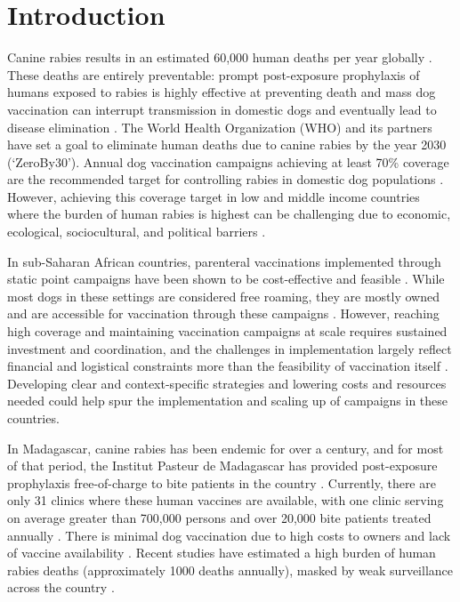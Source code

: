 \documentclass[tropicalmed,article,submit,moreauthors,pdftex]{mdpi}
\begin{document}

\hypertarget{introduction}{%
\section{Introduction}\label{introduction}}

Canine rabies results in an estimated 60,000 human deaths per year
globally \citep{hampson2015}. These deaths are entirely preventable:
prompt post-exposure prophylaxis of humans exposed to rabies is highly
effective at preventing death and mass dog vaccination can interrupt
transmission in domestic dogs and eventually lead to disease elimination
\citep{fooks2014}. The World Health Organization (WHO) and its partners
have set a goal to eliminate human deaths due to canine rabies by the
year 2030 (`ZeroBy30')\citep{abela-ridder2016}. Annual dog vaccination
campaigns achieving at least 70\% coverage are the recommended target
for controlling rabies in domestic dog populations
\citep{world2018expert}. However, achieving this coverage target in low
and middle income countries where the burden of human rabies is highest
can be challenging due to economic, ecological, sociocultural, and
political barriers \citep{fahrion2017}.

In sub-Saharan African countries, parenteral vaccinations implemented
through static point campaigns have been shown to be cost-effective and
feasible \citep{borse2018}. While most dogs in these settings are
considered free roaming, they are mostly owned and are accessible for
vaccination through these campaigns \citep{morters2014, jibat2015}.
However, reaching high coverage and maintaining vaccination campaigns at
scale requires sustained investment and coordination, and the challenges
in implementation largely reflect financial and logistical constraints
more than the feasibility of vaccination itself \citep{fahrion2017}.
Developing clear and context-specific strategies and lowering costs and
resources needed could help spur the implementation and scaling up of
campaigns in these countries.

In Madagascar, canine rabies has been endemic for over a century, and
for most of that period, the Institut Pasteur de Madagascar has provided
post-exposure prophylaxis free-of-charge to bite patients in the country
\citep{reynes2011}. Currently, there are only 31 clinics where these
human vaccines are available, with one clinic serving on average greater
than 700,000 persons and over 20,000 bite patients treated annually
\citep{rajeev2020}. There is minimal dog vaccination due to high costs
to owners and lack of vaccine availability \citep{rajeev2018}. Recent
studies have estimated a high burden of human rabies deaths
(approximately 1000 deaths annually), masked by weak surveillance across
the country \citep{rajeev2020, rajeev2018}.
\end{document}
